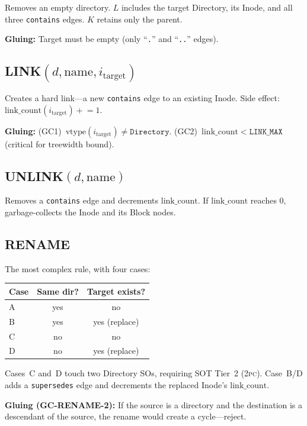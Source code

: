 \documentclass[11pt,a4paper]{article}
\theoremstyle{definition}
\newcommand{\TPC}{\textsc{2pc}}
\begin{document}
Removes an empty directory. $L$ includes the target Directory, its Inode,
and all three \texttt{contains} edges. $K$ retains only the parent.

\textbf{Gluing:} Target must be empty (only ``\texttt{.}'' and
``\texttt{..}'' edges).

\subsection{LINK$(d, \mathrm{name}, i_{\mathrm{target}})$}

Creates a hard link---a new \texttt{contains} edge to an existing Inode.
Side effect: $\mathrm{link\_count}(i_{\mathrm{target}}) \mathrel{+}= 1$.

\textbf{Gluing:} (GC1)~$\mathrm{vtype}(i_{\mathrm{target}}) \ne
\texttt{Directory}$. (GC2)~$\mathrm{link\_count} < \texttt{LINK\_MAX}$
(critical for treewidth bound).

\subsection{UNLINK$(d, \mathrm{name})$}

Removes a \texttt{contains} edge and decrements $\mathrm{link\_count}$.
If $\mathrm{link\_count}$ reaches 0, garbage-collects the Inode and its
Block nodes.

\subsection{RENAME}

The most complex rule, with four cases:
\begin{center}
\footnotesize
\begin{tabular}{lcc}
\toprule
\textbf{Case} & \textbf{Same dir?} & \textbf{Target exists?} \\
\midrule
A & yes & no \\
B & yes & yes (replace) \\
C & no & no \\
D & no & yes (replace) \\
\bottomrule
\end{tabular}
\end{center}

Cases~C and~D touch two Directory SOs, requiring SOT Tier~2 (\TPC{}).
Case~B/D adds a \texttt{supersedes} edge and decrements the replaced
Inode's $\mathrm{link\_count}$.

\textbf{Gluing (GC-RENAME-2):} If the source is a directory and the
destination is a descendant of the source, the rename would create a
cycle---reject.
\end{document}
